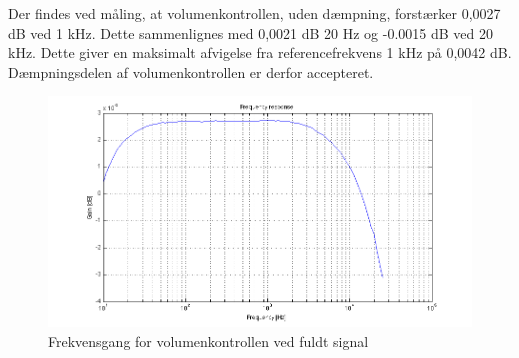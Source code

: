 Der findes ved måling, at volumenkontrollen, uden dæmpning, forstærker 0,0027 dB ved 1 kHz. Dette sammenlignes med 0,0021 dB 20 Hz og -0.0015 dB ved 20 kHz. Dette giver en maksimalt afvigelse fra referencefrekvens 1 kHz på 0,0042 dB. Dæmpningsdelen af volumenkontrollen er derfor accepteret.
\begin{figure}[h]
\centering
\includegraphics[width=\textwidth]{maalerapporter/volumenkontrol/2Vniveau0-frek.png}
\caption{Frekvensgang for volumenkontrollen ved fuldt signal}
\label{fig:accvold:frek0}
\end{figure}
